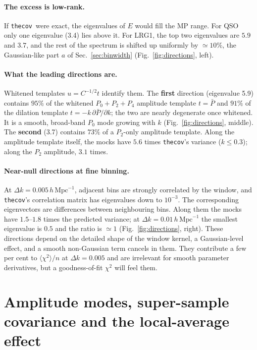 \documentclass[11pt]{article}
\newcommand{\thecov}{\texttt{thecov}}
\newcommand{\hk}{\,h\,\mathrm{Mpc}^{-1}}
\begin{document}
\paragraph{The excess is low-rank.} If \thecov\ were exact, the eigenvalues of $E$ would fill the MP range. For QSO only one eigenvalue (3.4) lies above it. For LRG1, the top two eigenvalues are $5.9$ and $3.7$, and the rest of the spectrum is shifted up uniformly by $\simeq10\%$, the Gaussian-like part $a$ of Sec.~\ref{sec:binwidth} (Fig.~\ref{fig:directions}, left).

\paragraph{What the leading directions are.} Whitened templates $u=C^{-1/2}t$ identify them. The \textbf{first} direction (eigenvalue 5.9) contains $95\%$ of the whitened $P_0{+}P_2{+}P_4$ amplitude template $t=\bar P$ and $91\%$ of the dilation template $t=-k\,\partial\bar P/\partial k$; the two are nearly degenerate once whitened. It is a smooth, broad-band $P_0$ mode growing with $k$ (Fig.~\ref{fig:directions}, middle). The \textbf{second} (3.7) contains $73\%$ of a $P_2$-only amplitude template. Along the amplitude template itself, the mocks have $5.6$ times \thecov's variance ($k\le0.3$); along the $P_2$ amplitude, $3.1$ times.

\paragraph{Near-null directions at fine binning.} At $\Delta k=0.005\hk$, adjacent bins are strongly correlated by the window, and \thecov's correlation matrix has eigenvalues down to $10^{-3}$. The corresponding eigenvectors are differences between neighbouring bins. Along them the mocks have $1.5$--$1.8$ times the predicted variance; at $\Delta k=0.01\hk$ the smallest eigenvalue is $0.5$ and the ratio is $\simeq1$ (Fig.~\ref{fig:directions}, right). These directions depend on the detailed shape of the window kernel, a Gaussian-level effect, and a smooth non-Gaussian term cancels in them. They contribute a few per cent to $\langle\chi^2\rangle/n$ at $\Delta k=0.005$ and are irrelevant for smooth parameter derivatives, but a goodness-of-fit $\chi^2$ will feel them.

\section{Amplitude modes, super-sample covariance and the local-average effect}
\label{sec:ssc}
\end{document}
